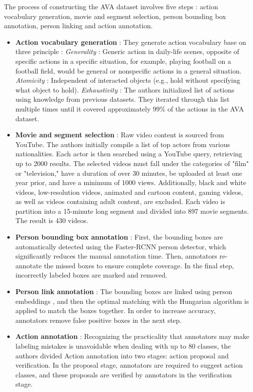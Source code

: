 \documentclass[10pt,onecolumn,letterpaper]{article}
\begin{document}
The process of constructing the AVA dataset involves five steps : action
vocabulary generation, movie and segment selection, person bounding box
annotation, person linking and action annotation.

\begin{itemize}
	\item \textbf{Action vocabulary generation} : They generate action vocabulary
	base on three principle :  
	\subitem \textit{Generality} : Generic action in daily-life scenes, opposite of
	specific actions in a specific situation, for example, playing football on a
	football field, would be general or nonspecific actions in a general situation.
	\subitem \textit{Atomicity} : Independent of interacted objects (e.g., hold
	without specifying what object to hold).
	\subitem \textit{Exhaustivity} : The authors initialized list of actions using
	knowledge
	from previous datasets. They iterated through this list multiple times until it
	covered approximately 99\% of the actions in the AVA dataset.
	
	\item \textbf{Movie and segment selection} : Raw video content is sourced from YouTube. The authors initially compile a list of top actors from various nationalities. Each actor is then searched using a YouTube query, retrieving up to 2000 results. The selected videos must fall under the categories of "film" or "television," have a duration of over 30 minutes, be uploaded at least one year prior, and have a minimum of 1000 views. Additionally, black and white videos, low-resolution videos, animated and cartoon content, gaming videos, as well as videos containing adult content, are excluded. Each video is partition into a 15-minute long segment and divided into 897 movie segments. The result is 430 videos.
	
	\item \textbf{Person bounding box annotation} : First, the bounding boxes are automatically detected using the Faster-RCNN \cite{faster-rcnn} person detector, which significantly reduces the manual annotation time. Then, annotators re-annotate the missed boxes to ensure complete coverage. In the final step, incorrectly labeled boxes are marked and removed.
	
	\item \textbf{Person link annotation} : The bounding boxes are linked using person embeddings \cite{personembedding}, and then the optimal matching with the Hungarian algorithm \cite{TheHungarian} is applied to match the boxes together. In order to increase accuracy, annotators remove false positive boxes in the next step.
	
	\item \textbf{Action annotation} : Recognizing the practicality that annotators may make labeling mistakes is unavoidable when dealing with up to 80 classes, the authors divided Action annotation into two stages: action proposal and verification. In the proposal stage, annotators are required to suggest action classes, and these proposals are verified by annotators in the verification stage.
	
\end{itemize}
	
\end{document}
